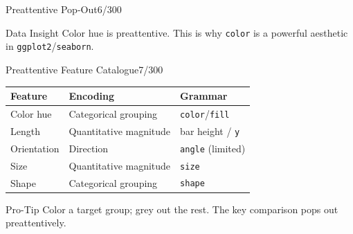 \documentclass[10pt]{beamer}
\newcommand{\smark}[1]{\hfill{\scriptsize\color{codegray}#1}}
\newcommand{\preattentivegrid}{%
\fill[dataviz2!80](0.0,0.0)circle(0.18);\fill[dataviz2!80](0.6,0.0)circle(0.18);%
\fill[dataviz2!80](1.2,0.0)circle(0.18);\fill[dataviz2!80](1.8,0.0)circle(0.18);%
\fill[dataviz2!80](2.4,0.0)circle(0.18);\fill[dataviz2!80](3.0,0.0)circle(0.18);%
\fill[dataviz2!80](3.6,0.0)circle(0.18);\fill[dataviz2!80](4.2,0.0)circle(0.18);%
\fill[dataviz2!80](4.8,0.0)circle(0.18);\fill[dataviz2!80](5.4,0.0)circle(0.18);%
\fill[dataviz2!80](0.0,0.6)circle(0.18);\fill[dataviz2!80](0.6,0.6)circle(0.18);%
\fill[dataviz2!80](1.2,0.6)circle(0.18);\fill[dataviz2!80](1.8,0.6)circle(0.18);%
\fill[dataviz2!80](2.4,0.6)circle(0.18);\fill[dataviz2!80](3.0,0.6)circle(0.18);%
\fill[dataviz2!80](3.6,0.6)circle(0.18);\fill[dataviz2!80](4.2,0.6)circle(0.18);%
\fill[dataviz2!80](4.8,0.6)circle(0.18);\fill[dataviz2!80](5.4,0.6)circle(0.18);%
\fill[dataviz2!80](0.0,1.2)circle(0.18);\fill[dataviz2!80](0.6,1.2)circle(0.18);%
\fill[dataviz2!80](1.2,1.2)circle(0.18);\fill[dataviz2!80](1.8,1.2)circle(0.18);%
\fill[dataviz2!80](2.4,1.2)circle(0.18);\fill[dataviz2!80](3.0,1.2)circle(0.18);%
\fill[dataviz2!80](3.6,1.2)circle(0.18);\fill[dataviz2!80](4.2,1.2)circle(0.18);%
\fill[dataviz2!80](4.8,1.2)circle(0.18);\fill[dataviz2!80](5.4,1.2)circle(0.18);%
\fill[dataviz2!80](0.0,1.8)circle(0.18);\fill[dataviz2!80](0.6,1.8)circle(0.18);%
\fill[dataviz2!80](1.2,1.8)circle(0.18);\fill[dataviz2!80](1.8,1.8)circle(0.18);%
\fill[dataviz2!80](2.4,1.8)circle(0.18);\fill[dataviz1](3.0,1.8)circle(0.18);%
\fill[dataviz2!80](3.6,1.8)circle(0.18);\fill[dataviz2!80](4.2,1.8)circle(0.18);%
\fill[dataviz2!80](4.8,1.8)circle(0.18);\fill[dataviz2!80](5.4,1.8)circle(0.18);%
\fill[dataviz2!80](0.0,2.4)circle(0.18);\fill[dataviz2!80](0.6,2.4)circle(0.18);%
\fill[dataviz2!80](1.2,2.4)circle(0.18);\fill[dataviz2!80](1.8,2.4)circle(0.18);%
\fill[dataviz2!80](2.4,2.4)circle(0.18);\fill[dataviz2!80](3.0,2.4)circle(0.18);%
\fill[dataviz2!80](3.6,2.4)circle(0.18);\fill[dataviz2!80](4.2,2.4)circle(0.18);%
\fill[dataviz2!80](4.8,2.4)circle(0.18);\fill[dataviz2!80](5.4,2.4)circle(0.18);%
\fill[dataviz2!80](0.0,3.0)circle(0.18);\fill[dataviz2!80](0.6,3.0)circle(0.18);%
\fill[dataviz2!80](1.2,3.0)circle(0.18);\fill[dataviz2!80](1.8,3.0)circle(0.18);%
\fill[dataviz2!80](2.4,3.0)circle(0.18);\fill[dataviz2!80](3.0,3.0)circle(0.18);%
\fill[dataviz2!80](3.6,3.0)circle(0.18);\fill[dataviz2!80](4.2,3.0)circle(0.18);%
\fill[dataviz2!80](4.8,3.0)circle(0.18);\fill[dataviz2!80](5.4,3.0)circle(0.18);%
}
\begin{document}
\begin{frame}{Preattentive Pop-Out}\smark{6/300}
\centering
{}
\vspace{0.2cm}
\begin{exampleblock}{Data Insight}
    \scriptsize Color hue is preattentive. This is why \texttt{color} is a powerful aesthetic in \texttt{ggplot2}/\texttt{seaborn}.
\end{exampleblock}
\end{frame}

\begin{frame}{Preattentive Feature Catalogue}\smark{7/300}
\centering\small
\begin{tabular}{@{}lll@{}}
    \toprule
    \textbf{Feature} & \textbf{Encoding} & \textbf{Grammar} \\
    \midrule
    Color hue   & Categorical grouping   & \texttt{color}/\texttt{fill} \\
    Length       & Quantitative magnitude & bar height / \texttt{y} \\
    Orientation  & Direction              & \texttt{angle} (limited) \\
    Size         & Quantitative magnitude & \texttt{size} \\
    Shape        & Categorical grouping   & \texttt{shape} \\
    \bottomrule
\end{tabular}
\vspace{0.3cm}
\begin{alertblock}{Pro-Tip}
    \scriptsize Color a target group; grey out the rest. The key comparison pops out preattentively.
\end{alertblock}
\end{frame}
\end{document}
